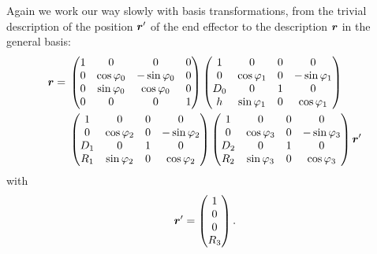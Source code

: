 Again we work our way slowly with basis transformations, from the trivial
description of the position $\bm{r}'$ of the end effector to the
description $\bm{r}$ in the general basis:
\begin{align*}
  \bm{r} =\;
  &\begin{pmatrix}
     1 & 0 & 0 & 0 \\
     0 & \cos\varphi_0 & -\sin\varphi_0 & 0 \\
     0 & \sin\varphi_0 & \cos\varphi_0 & 0 \\
     0 & 0 & 0 & 1
   \end{pmatrix}
   \begin{pmatrix}
     1 & 0 & 0 & 0 \\
     0 & \cos\varphi_1 & 0 & -\sin\varphi_1 \\
     D_0 & 0 & 1 & 0 \\
     h & \sin\varphi_1 & 0 & \cos\varphi_1
   \end{pmatrix} \\
  &\begin{pmatrix}
     1 & 0 & 0 & 0 \\
     0 & \cos\varphi_2 & 0 & -\sin\varphi_2 \\
     D_1 & 0 & 1 & 0 \\
     R_1 & \sin\varphi_2 & 0 & \cos\varphi_2
   \end{pmatrix}
   \begin{pmatrix}
     1 & 0 & 0 & 0 \\
     0 & \cos\varphi_3 & 0 & -\sin\varphi_3 \\
     D_2 & 0 & 1 & 0 \\
     R_2 & \sin\varphi_3 & 0 & \cos\varphi_3
   \end{pmatrix}
   \bm{r}'
\end{align*}
with
\[
  \bm{r}' = \begin{pmatrix} 1 \\ 0 \\ 0 \\ R_3 \end{pmatrix} .
\]
